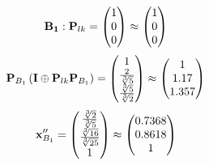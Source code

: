 \documentclass[10pt,a4paper]{article}
\begin{document}
	\[
		\bold{B_1}: \bold{P}_{lk} = 
		\begin{pmatrix}
			{1} {} \\
			{{0}} {} \\
			{{0}} {} \\
		\end{pmatrix}
		\approx
		\begin{pmatrix}
			1        \\
			0        \\
			0        \\
		\end{pmatrix}
	\]
	\[
		\bold{P}_{B_1}\left(\bold{I} \oplus \bold{P}_{lk}\bold{P}_{B_1}\right) = 
		\begin{pmatrix}
			{1} {} \\
			\frac{{2}} {\sqrt[3]{5}} \\
			\frac{\sqrt[3]{5}} {\sqrt[3]{2}} \\
		\end{pmatrix}
		\approx
		\begin{pmatrix}
			1        \\
			1.17     \\
			1.357    \\
		\end{pmatrix}
	\]
	\[
		\bold{x}''_{B_1} = 
		\begin{pmatrix}
			\frac{\sqrt[3]{2}} {\sqrt[3]{5}} \\
			\frac{\sqrt[3]{16}} {\sqrt[3]{25}} \\
			{1} {} \\
		\end{pmatrix}
		\approx
		\begin{pmatrix}
			0.7368   \\
			0.8618   \\
			1        \\
		\end{pmatrix}
	\]
\end{document}
